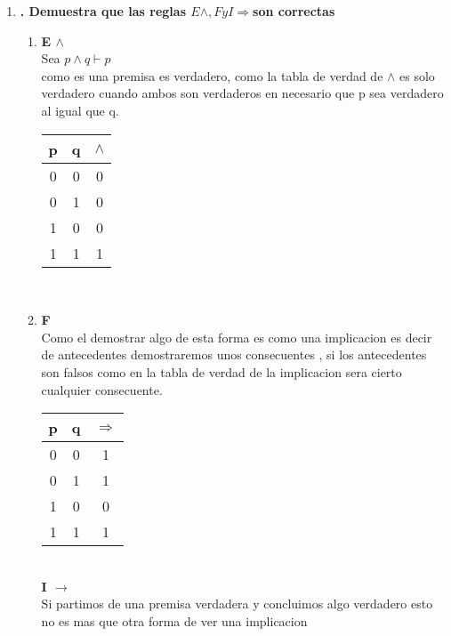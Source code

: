 \documentclass[10pt,letterpaper,fleqn]{article}
\begin{document}
\begin{enumerate}
        \item \textbf{ . Demuestra que las reglas $E \wedge, F y I \Rightarrow  $son correctas }
        \begin{enumerate}
            \item \textbf{ E $ \wedge $}
            \\Sea $p\wedge q \vdash p$ 
            \\como es una premisa es verdadero, como la tabla de verdad de $\wedge$ es solo verdadero cuando ambos son verdaderos en necesario que p sea verdadero al igual que q.
            \\ \begin{tabular}{|c|c|c|}
                \hline
                p & q & $\wedge$ 
                \\ \hline
                0 & 0 & 0
                \\\hline
                0 & 1 & 0
                \\\hline
                1 & 0 & 0
                \\\hline
                1 & 1 & 1
                \\\hline
            \end{tabular}\\
            
            \item \textbf{F}
            \\Como el demostrar algo de esta forma es como una implicacion es decir de antecedentes  demostraremos unos consecuentes , si los antecedentes son falsos como en la tabla de verdad de la implicacion sera cierto cualquier consecuente.
            \\ \begin{tabular}{|c|c|c|}
                \hline
                p & q & $\Rightarrow$ 
                \\ \hline
                0 & 0 & 1
                \\\hline
                0 & 1 & 1
                \\\hline
                1 & 0 & 0
                \\\hline
                1 & 1 & 1
                \\\hline
            \end{tabular}\\
            
            \textbf{I $\rightarrow$}
            \\Si partimos de una premisa verdadera y concluimos algo  verdadero esto no es mas que otra forma de ver una implicacion
        \end{enumerate}
            
    \end{enumerate}
\end{document}
